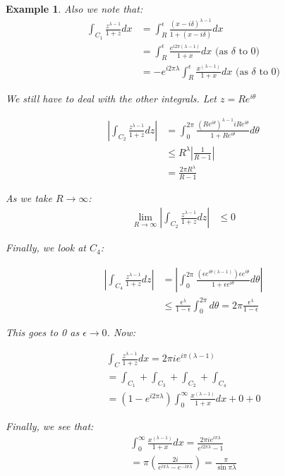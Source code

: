 \documentclass{article}
\newtheorem{ex}{Example}
\theoremstyle{definition}
\begin{document}
\begin{ex}
Also we note that:
\begin{align*}
\int_{C_1}\frac{z^{\lambda-1}}{1+z} dx &= \int_R^\epsilon \frac{(x-i\delta)^{\lambda-1}}{1+(x-i\delta)} dx \\ 
& = \int_R^\epsilon \frac{e^{i2\pi(\lambda-1)}}{1+x} dx \text{ (as $\delta$ to 0)} \\ 
& = -e^{i2\pi\lambda} \int_R^\epsilon \frac{x^{(\lambda-1)}}{1+x} dx \text{ (as $\delta$ to 0)} 
\end{align*}


We still have to deal with the other integrals. Let $z=Re^{i\theta}$

\begin{align*}
\left| \int_{C_2} \frac{z^{\lambda-1}}{1+z} dz\right| &= \int_0^{2\pi} \frac{(Re^{i\theta})^{\lambda-1} i Re^{i\theta}}{1 + Re^{i\theta}} d\theta \\ 
&\leq  R^\lambda \left| \frac{1}{R-1}\right| \\
& = \frac{2\pi R^\lambda}{R-1}
\end{align*}

As we take $R \to \infty$:
\begin{align*}
\lim_{R\to \infty } \left| \int_{C_2} \frac{z^{\lambda-1}}{1+z} dz\right| &\leq  0
\end{align*}


Finally, we look at $C_4$:

\begin{align*}
\left| \int_{C_4} \frac{z^{\lambda-1}}{1+z} dz\right| &= \left|\int_0^{2\pi } \frac{(\epsilon e^{i \theta(\lambda -1)})\epsilon e^{i \theta}}{1 + \epsilon e^{i \theta}} d\theta \right| \\ 
& \leq \frac{\epsilon^\lambda}{1-\epsilon} \int_{0}^{2\pi }d\theta = 2 \pi \frac{\epsilon^\lambda}{1-\epsilon}
\end{align*}

This goes to 0 as $\epsilon \to 0$. Now:

\begin{align*}
\int_C \frac{z^{\lambda-1}}{1+z} dx = 2 \pi i e^{i \pi (\lambda-1)} \\ 
= \int_{C_1} +\int_{C_3} + \int_{C_2} +  \int_{C_4} \\ 
=  (1-e^{i2\pi\lambda}) \int_0^\infty \frac{x^{(\lambda-1)}}{1+x} dx+ 0 + 0
\end{align*}

Finally, we see that: 
\begin{align*}
\int_0^\infty \frac{x^{(\lambda-1)}}{1+x} dx = \frac{2\pi i e^{i \pi \lambda }}{e^{i2 \pi \lambda } - 1} \\ 
= \pi \left(\frac{2i}{e^{i \pi \lambda } - e^{-i \pi \lambda }}\right)
= \frac{\pi}{\sin \pi \lambda }
\end{align*}

\end{ex}
\end{document}
